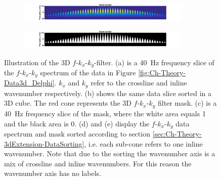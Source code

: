 \begin{figure}
	\begin{subfigure}[t]{\textwidth}
		\centering
		\includegraphics[width=0.9\textwidth]{Plots/IdealData3d/P_fkk_Delphi}
		\caption{}
		\label{fig:Ch-Theory-FK-delphi-data}
	\end{subfigure}
	\par\bigskip
	\begin{subfigure}[t]{\textwidth}
		\centering
		\includegraphics[width=0.9\textwidth]{Plots/IdealData3d/fkk-mask-Delphi}
		\caption{}
		\label{fig:Ch-Theory-FK-delphi-mask}
	\end{subfigure}
	
	\caption{Illustration of the 3D $f$-$k_x$-$k_y$-filter. (a) is a \SI{40}{\hertz} frequency slice of the $f$-$k_x$-$k_y$ spectrum of the data in Figure \ref{fig:Ch-Theory-Data3d_Delphi}. $k_x$ and $k_y$ refer to the crossline and inline wavenumber respectively. (b) shows the same data slice sorted in a 3D cube. The red cone represents the 3D $f$-$k_x$-$k_y$ filter mask. (c) is a \SI{40}{\hertz} frequency slice of the mask, where the white area equals 1 and the black area is 0. (d) and (e) display the $f$-$k_x$-$k_y$ data spectrum and mask sorted according to section \ref{sec:Ch-Theory-3dExtension-DataSorting}, i.e. each sub-cone refers to one inline wavenumber. Note that due to the sorting the wavenumber axis is a mix of crossline and inline wavenumbers. For this reason the wavenumber axis has no labels.}
	\label{fig:Ch-Theory-FKK-Mask}

\end{figure}



